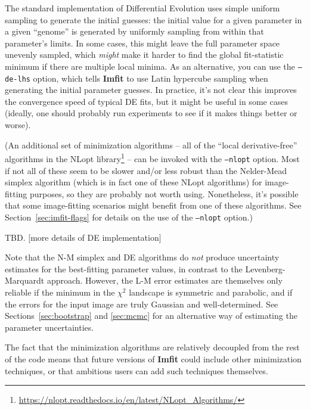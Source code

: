 \documentclass[10pt,a4paper,article]{memoir}
\newcommand{\imfit}{\textbf{Imfit}}
\newcommand{\chisquare}{\ensuremath{\chi^{2}}}
\begin{document}
The standard implementation of Differential Evolution uses simple
uniform sampling to generate the initial guesses: the initial value for
a given parameter in a given ``genome'' is generated by uniformly
sampling from within that parameter's limits. In some cases, this might
leave the full parameter space unevenly sampled, which \textit{might}
make it harder to find the global fit-statistic minimum if there are
multiple local minima. As an alternative, you can use the
\texttt{--de-lhs} option, which tells \imfit{} to use Latin hypercube
sampling when generating the initial parameter guesses. In practice,
it's not clear this improves the convergence speed of typical DE fits,
but it might be useful in some cases (ideally, one should probably run
experiments to see if it makes things better or worse).

(An additional set of minimization algorithms -- all of the ``local
derivative-free'' algorithms in the NLopt
library\footnote{\url{https://nlopt.readthedocs.io/en/latest/NLopt_Algorithms/}} -- can be invoked
with the \texttt{--nlopt} option. Most if not all of these seem to be
slower and/or less robust than the Nelder-Mead simplex algorithm (which
is in fact one of these NLopt algorithms) for image-fitting purposes, so
they are probably not worth using. Nonetheless, it's possible that some
image-fitting scenarios might benefit from one of these algorithms. See
Section~\ref{sec:imfit-flags} for details on the use of the
\texttt{--nlopt} option.)

\medskip

TBD. [more details of DE implementation]


\medskip

Note that the N-M simplex and DE algorithms do \textit{not} produce
uncertainty estimates for the best-fitting parameter values, in contrast
to the Levenberg-Marquardt approach. However, the L-M error estimates
are themselves only reliable if the minimum in the \chisquare{}
landscape is symmetric and parabolic, and if the errors for the input
image are truly Gaussian and well-determined.  See
Sections~\ref{sec:bootstrap} and \ref{sec:mcmc} for an alternative way of estimating the
parameter uncertainties.

\medskip

The fact that the minimization algorithms are relatively decoupled from the rest
of the code means that future versions of \imfit{} could include
other minimization techniques, or that ambitious users can add such techniques
themselves.
\end{document}
